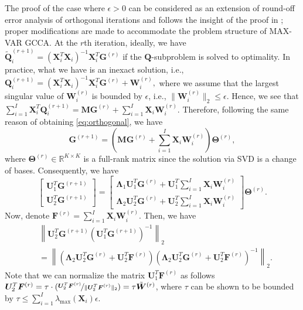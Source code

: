 \documentclass[10pt,journal]{IEEEtran}
\newcommand{\G}{\boldsymbol{G}}
\newcommand{\Q}{\boldsymbol{Q}}
\newcommand{\X}{\boldsymbol{X}}
\newcommand{\U}{\boldsymbol{U}}
\newcommand{\M}{\boldsymbol{M}}
\begin{document}
The proof of the case where $\epsilon>0$ can be considered as an extension of round-off error analysis
of orthogonal iterations and follows the insight of the proof in \cite{lu2014large}; proper modifications are made to accommodate the problem structure of MAX-VAR GCCA.
At the $r$th iteration, ideally, we have
${\tilde{\bm Q}_i^{(r+1)}}= ({\bm X}_i^T{\bm X}_i)^{-1}{\bm X}_i^T{\bm G}^{(r)}$
if the $\Q$-subproblem is solved to optimality.
In practice, what we have is an inexact solution, i.e.,
${\Q}_i^{(r+1)}= ({\bm X}_i^T{\bm X}_i)^{-1}{\bm X}_i^T{\bm G}^{(r)} + {\bm W}_i^{(r)},$
where we assume that the largest singular value of ${\bm W}_i^{(r)}$ is bounded by $\epsilon$, i.e., $\|{\bm W}_i^{(r)}\|_2\leq\epsilon$.
Hence, we see that
$\sum_{i=1}^I{\bm X}_i^T\Q_i^{(r+1)} = \M\G^{(r)} + \sum_{i=1}^I \X_i{\bm W}_i^{(r)}.$
Therefore, following the same reason of obtaining \eqref{eq:orthogonal}, we have
\[\G^{(r+1)} =   \left(\M\G^{(r)} + \sum_{i=1}^I \X_i{\bm W}_i^{(r)}\right) {\bm \Theta}^{(r)},\]
where ${\bm \Theta}^{(r)}\in\mathbb{R}^{K\times K}$ is a full-rank matrix since the solution via SVD is a change of  bases.
Consequently, we have
\begin{equation*}
\begin{bmatrix}
\U_1^T\G^{(r+1)}\\ \U_2^T\G^{(r+1)}
\end{bmatrix}
=
\begin{bmatrix}
\bm \Lambda_1 \U_1^T\G^{(r)} + \U_1^T  \sum_{i=1}^I \X_i{\bm W}_i^{(r)} \\ \bm \Lambda_2 \U_2^T\G^{(r)} + \U_2^T  \sum_{i=1}^I \X_i{\bm W}_i^{(r)}
\end{bmatrix}
{\bm \Theta}^{(r)}.
\end{equation*}
Now, denote ${\bm F}^{(r)}=\sum_{i=1}^I \X_i{\bm W}_i^{(r)}$. Then, we have 
\begin{align}\label{eq:observe}
&\left\| \U_2^T\G^{(r+1)}\left( \U_1^T\G^{(r+1)} \right)^{-1}  \right\|_2\\
& = \left\|\left(\bm \Lambda_2 \U_2^T\G^{(r)} + \U_2^T  {\bm F}^{(r)}  \right)\left(\bm \Lambda_2 \U_2^T\G^{(r)} + \U_2^T  {\bm F}^{(r)}  \right)^{-1}\right\|_2. \nonumber
\end{align}
Note that we can normalize the matrix $\U_1^T  {\bm F}^{(r)}$ as follows
$\U_2^T{\bm F}^{(r)} = \tau\cdot  (\nicefrac{\U_2^T  {\bm F}^{(r)}  }{\|\U_2^T {\bm F}^{(r)} \|_2})=\tau\tilde{\bm W}^{(r)}$,    
where $\tau$ can be shown to be bounded by $\tau \leq \sum_{i=1}^I\lambda_{\max}(\X_i)\epsilon$.
\end{document}
